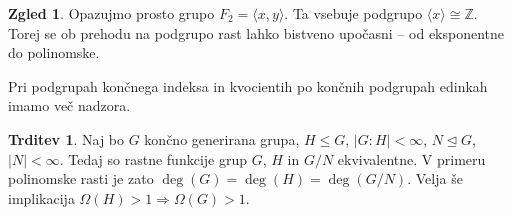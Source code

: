 \documentclass[11pt]{book}
\def\ZZ{\mathbb{Z}}
\theoremstyle{definition}
\theoremstyle{zgled}
\newtheorem*{zgled}{Zgled}
\theoremstyle{odprtproblem}
\theoremstyle{domacanaloga}
\theoremstyle{izrek}
\newtheorem*{trditev}{Trditev}
\begin{document}
\begin{zgled}
Opazujmo prosto grupo $F_2 = \langle x,y \rangle$. Ta vsebuje podgrupo $\langle x \rangle \cong \ZZ$. Torej se ob prehodu na podgrupo rast lahko bistveno upočasni -- od eksponentne do polinomske.
\end{zgled}

Pri podgrupah končnega indeksa in kvocientih po končnih podgrupah edinkah imamo več nadzora.


\begin{trditev}
Naj bo $G$ končno generirana grupa, $H \leq G$, $|G:H| < \infty$, $N \unlhd G$, $|N| < \infty$. Tedaj so rastne funkcije grup $G$, $H$ in $G/N$ ekvivalentne. V primeru polinomske rasti je zato $\deg(G) = \deg(H) = \deg(G/N)$.
Velja še implikacija $\Omega(H) > 1 \Rightarrow \Omega(G) > 1$.
\end{trditev}
\end{document}
